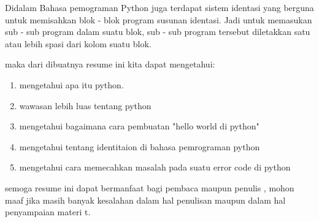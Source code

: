 \documentclass[12pt]{article}
\begin{document}
	Didalam Bahasa pemograman Python juga terdapat sistem identasi yang berguna untuk memisahkan blok - blok program susunan identasi. Jadi untuk memasukan sub - sub program dalam suatu blok, sub - sub program tersebut diletakkan satu atau lebih spasi dari kolom suatu blok\cite{kurniawan2011aplikasi}.
	
maka dari dibuatnya resume ini kita dapat mengetahui: 
	
\begin{enumerate}
\item mengetahui apa itu python.
\item wawasan lebih luas tentang python
\item mengetahui bagaimana cara pembuatan "hello world di python"
\item mengetahui tentang identitaion di bahasa pemrograman python
\item mengetahui cara memecahkan masalah pada suatu error code di python

\end{enumerate}
semoga resume ini dapat bermanfaat bagi pembaca maupun penulis , mohon maaf jika masih banyak kesalahan dalam hal penulisan maupun dalam hal penyampaian materi t\cite{van2014sciki}.
	
	
\end{document}
